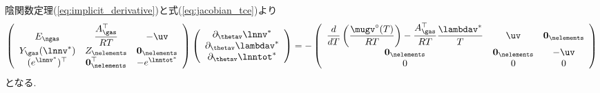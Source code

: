 陰関数定理(\ref{eq:implicit_derivative})と式(\ref{eq:jacobian_tce})より
\begin{align}
        \left(
\begin{array}{ccc}
 E_\ngas &  \dfrac{A_\gas^\top}{RT} & - \uv\\ 
 Y_\gas(\lnnv^\ast) & Z_\nelements & \boldsymbol{0}_\nelements \\ 
 (e^{\lnnv^\ast})^\top & \boldsymbol{0}_\nelements^\top & - e^{\lnntot^\ast}\\  
\end{array}
\right)
    \left(
\begin{array}{c}
\partial_{\thetav} {\lnnv}^\ast \\
\partial_{\thetav} {\lambdav}^\ast \\
\partial_{\thetav} \lnntot^\ast
\end{array}
\right)
=
- \left(
\begin{array}{ccc}
\dfrac{d}{d T} \left( \dfrac{\mugv^\circ (T)}{R T} \right) - \dfrac{A_\gas^\top }{R T} \dfrac{\lambdav^\ast}{T} & \uv & \boldsymbol{0}_\nelements\\
\boldsymbol{0}_\nelements & \boldsymbol{0}_\nelements & - \uv\\
0 & 0 & 0 \\
\end{array}
\right)
\end{align}
となる. 

